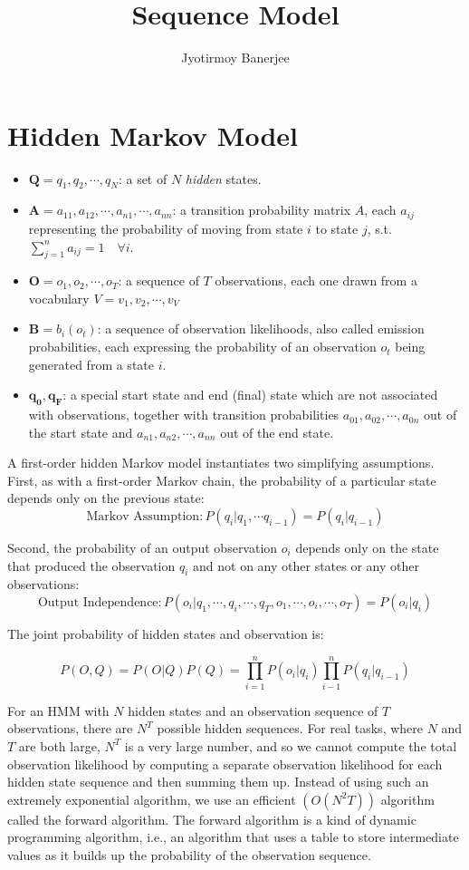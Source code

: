 \documentclass{article}
\title{Sequence Model}
\author{Jyotirmoy Banerjee}
\begin{document}
\maketitle

\section{Hidden Markov Model}

\begin{itemize}
\item $\mathbf{Q} = q_1,q_2, \cdots, q_N$: a set of $N$ \emph{hidden} states.
\item $\mathbf{A} = a_{11},a_{12}, \cdots, a_{n1}, \cdots, a_{nn}$: a transition probability matrix $A$, each $a_{ij}$ representing the probability of moving from state $i$ to state $j$, s.t.\ $\sum_{j=1}^{n}a_{ij} = 1 \quad  \forall i$.
\item $\mathbf{O} = o_1, o_2, \cdots, o_T$: a sequence of $T$ observations, each one drawn from a vocabulary $V = v_1, v_2, \cdots, v_V$
\item $\mathbf{B} = b_i(o_t)$: a sequence of observation likelihoods, also called emission probabilities, each expressing the probability of an observation $o_t$ being generated from a state $i$.
\item $\mathbf{q_0,q_F}$: a special start state and end (final) state which are not associated with observations, together with transition probabilities $a_{01},a_{02}, \cdots, a_{0n}$ out of the start state and $a_{n1},a_{n2}, \cdots, a_{nn}$ out of the end state.
\end{itemize}

A first-order hidden Markov model instantiates two simplifying assumptions.
First, as with a first-order Markov chain, the probability of a particular state depends
only on the previous state:
\[\text{Markov Assumption}:  P(q_i | q_1,\cdots q_{i-1}) = P(q_i | q_{i-1}) \]

Second, the probability of an output observation $o_i$ depends only on the state that
produced the observation $q_i$ and not on any other states or any other observations:
\[\text{Output Independence}: P(o_i|q_1,\cdots,q_i,\cdots,q_T,o_1,\cdots,o_i,\cdots,o_T) = P(o_i | q_i)\]

The joint probability of hidden states and observation is:

\[ P(O, Q) = P(O|Q) P(Q) = \prod_{i=1}^{n} P(o_i | q_i) \prod_{i-1}^{n} P(q_i | q_{i-1}) \]


For an HMM with $N$ hidden states and an observation sequence of $T$ observations, there are $N^T$ possible hidden sequences. For real tasks, where $N$ and $T$ are both large, $N^T$ is a very large number, and so we cannot compute the total observation likelihood by computing a separate observation likelihood for each hidden state sequence and then summing them up. Instead of using such an extremely exponential algorithm, we use an efficient $(O(N^2 T))$ algorithm called the forward algorithm. The forward algorithm is a kind of dynamic programming algorithm, i.e., an algorithm that uses a table to store intermediate values as it builds up the probability of the observation sequence.
\end{document}
